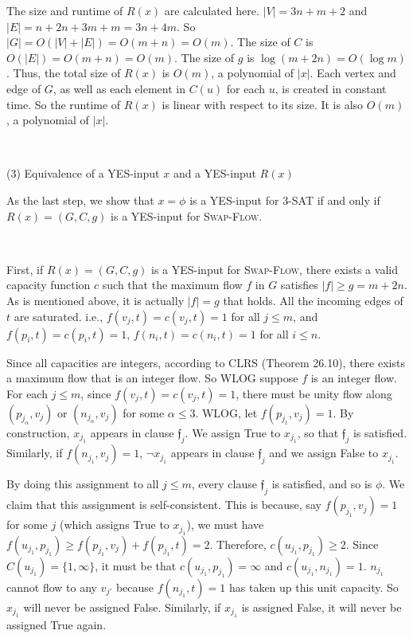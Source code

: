 \documentclass{article}
\begin{document}
The size and runtime of $R(x)$ are calculated here. $|V|=3n+m+2$ and $|E|=n+2n+3m+m=3n+4m$. So $|G|=O(|V|+|E|)=O(m+n)=O(m)$. The size of $C$ is $O(|E|)=O(m+n)=O(m)$. The size of $g$ is $\log(m+2n)=O(\log m)$. Thus, the total size of $R(x)$ is $O(m)$, a polynomial of $|x|$. Each vertex and edge of $G$, as well as each element in $C(u)$ for each $u$, is created in constant time. So the runtime of $R(x)$ is linear with respect to its size. It is also $O(m)$, a polynomial of $|x|$.

~

\noindent(3) Equivalence of a YES-input $x$ and a YES-input $R(x)$

As the last step, we show that $x=\phi$ is a YES-input for \textsc{3-SAT} if and only if $R(x)=(G,C,g)$ is a YES-input for \textsc{Swap-Flow}.

~

First, if $R(x)=(G,C,g)$ is a YES-input for \textsc{Swap-Flow}, there exists a valid capacity function $c$ such that the maximum flow $f$ in $G$ satisfies $|f|\geqslant g=m+2n$. As is mentioned above, it is actually $|f|=g$ that holds. All the incoming edges of $t$ are saturated. i.e., $f(v_j,t)=c(v_j,t)=1$ for all $j\leqslant m$, and $f(p_i,t)=c(p_i,t)=1$, $f(n_i,t)=c(n_i,t)=1$ for all $i\leqslant n$.

Since all capacities are integers, according to CLRS (Theorem 26.10), there exists a maximum flow that is an integer flow. So WLOG suppose $f$ is an integer flow. For each $j\leqslant m$, since $f(v_j,t)=c(v_j,t)=1$, there must be unity flow along $(p_{j_\alpha},v_j)$ or $(n_{j_\alpha},v_j)$ for some $\alpha\leqslant3$. WLOG, let $f(p_{j_1},v_j)=1$. By construction, $x_{j_1}$ appears in clause $\mathfrak{f}_j$. We assign True to $x_{j_1}$, so that $\mathfrak{f}_j$ is satisfied. Similarly, if $f(n_{j_1},v_j)=1$, $\neg x_{j_1}$ appears in clause $\mathfrak{f}_j$ and we assign False to $x_{j_1}$.

By doing this assignment to all $j\leqslant m$, every clause $\mathfrak{f}_j$ is satisfied, and so is $\phi$. We claim that this assignment is self-consistent. This is because, say $f(p_{j_1},v_j)=1$ for some $j$ (which assigns True to $x_{j_1}$), we must have $f(u_{j_1},p_{j_1})\geqslant f(p_{j_1},v_j)+f(p_{j_1},t)=2$. Therefore, $c(u_{j_1},p_{j_1})\geqslant2$. Since $C(u_{j_1})=\{1,\infty\}$, it must be that $c(u_{j_1},p_{j_1})=\infty$ and $c(u_{j_1},n_{j_1})=1$. $n_{j_1}$ cannot flow to any $v_{j'}$ because $f(n_{j_1},t)=1$ has taken up this unit capacity. So $x_{j_1}$ will never be assigned False. Similarly, if $x_{j_1}$ is assigned False, it will never be assigned True again.
\end{document}
